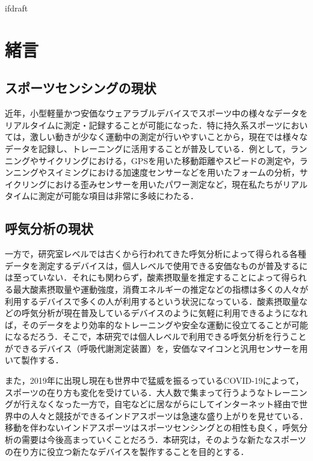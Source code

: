 \expandafter\ifx\csname ifdraft\endcsname\relax
 
\fi

\section{緒言}

\subsection{スポーツセンシングの現状}

近年，小型軽量かつ安価なウェアラブルデバイスでスポーツ中の様々なデータをリアルタイムに測定・記録することが可能になった．特に持久系スポーツにおいては，激しい動きが少なく運動中の測定が行いやすいことから，現在では様々なデータを記録し、トレーニングに活用することが普及している．例として，ランニングやサイクリングにおける，GPSを用いた移動距離やスピードの測定や，ランニングやスイミングにおける加速度センサーなどを用いたフォームの分析，サイクリングにおける歪みセンサーを用いたパワー測定など，現在私たちがリアルタイムに測定が可能な項目は非常に多岐にわたる．

\subsection{呼気分析の現状}

一方で，研究室レベルでは古くから行われてきた呼気分析によって得られる各種データを測定するデバイスは，個人レベルで使用できる安価なものが普及するには至っていない．それにも関わらず，酸素摂取量を推定することによって得られる最大酸素摂取量や運動強度，消費エネルギーの推定などの指標は多くの人々が利用するデバイスで多くの人が利用するという状況になっている．酸素摂取量などの呼気分析が現在普及しているデバイスのように気軽に利用できるようになれば，そのデータをより効率的なトレーニングや安全な運動に役立てることが可能になるだろう．そこで，本研究では個人レベルで利用できる呼気分析を行うことができるデバイス（呼吸代謝測定装置）を，安価なマイコンと汎用センサーを用いて製作する．

また，2019年に出現し現在も世界中で猛威を振るっているCOVID-19によって，スポーツの在り方も変化を受けている．大人数で集まって行うようなトレーニングが行えなくなった一方で，自宅などに居ながらにしてインターネット経由で世界中の人々と競技ができるインドアスポーツは急速な盛り上がりを見せている．移動を伴わないインドアスポーツはスポーツセンシングとの相性も良く，呼気分析の需要は今後高まっていくことだろう．本研究は，そのような新たなスポーツの在り方に役立つ新たなデバイスを製作することを目的とする．

